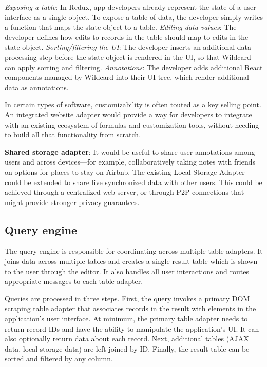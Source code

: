\documentclass[sigplan,screen,10pt,anonymous,review]{acmart}
\begin{document}
\emph{Exposing a table}: In Redux, app developers already represent the
state of a user interface as a single object. To expose a table of data,
the developer simply writes a function that maps the state object to a
table. \emph{Editing data values}: The developer defines how edits to
records in the table should map to edits in the state object.
\emph{Sorting/filtering the UI}: The developer inserts an additional
data processing step before the state object is rendered in the UI, so
that Wildcard can apply sorting and filtering. \emph{Annotations}: The
developer adds additional React components managed by Wildcard into
their UI tree, which render additional data as annotations.

In certain types of software, customizability is often touted as a key
selling point. An integrated website adapter would provide a way for
developers to integrate with an existing ecosystem of formulas and
customization tools, without needing to build all that functionality
from scratch.

\textbf{Shared storage adapter}: It would be useful to share user
annotations among users and across devices---for example,
collaboratively taking notes with friends on options for places to stay
on Airbnb. The existing Local Storage Adapter could be extended to share
live synchronized data with other users. This could be achieved through
a centralized web server, or through P2P connections that might provide
stronger privacy guarantees.

\hypertarget{query-engine}{%
\subsection{Query engine}\label{query-engine}}

The query engine is responsible for coordinating across multiple table
adapters. It joins data across multiple tables and creates a single
result table which is shown to the user through the editor. It also
handles all user interactions and routes appropriate messages to each
table adapter.

Queries are processed in three steps. First, the query invokes a primary
DOM scraping table adapter that associates records in the result with
elements in the application's user interface. At minimum, the primary
table adapter needs to return record IDs and have the ability to
manipulate the application's UI. It can also optionally return data
about each record. Next, additional tables (AJAX data, local storage
data) are left-joined by ID. Finally, the result table can be sorted and
filtered by any column.
\end{document}
